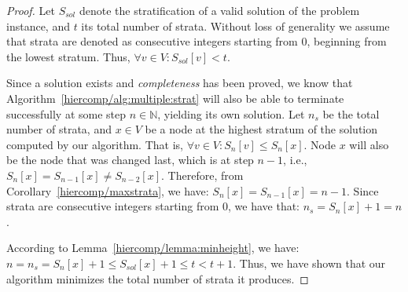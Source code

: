 \begin{proof}
  Let $S_{sol}$ denote the stratification of a valid solution of the
  problem instance, and $t$ its total number of strata. Without loss
  of generality we assume that strata are denoted as consecutive
  integers starting from $0$, beginning from the lowest stratum. Thus,
  $\forall v \in V : S_{sol}[v] < t$.

  Since a solution exists and \emph{completeness} has been proved, we
  know that Algorithm~\ref{hiercomp/alg:multiple:strat} will also be
  able to terminate successfully at some step $n \in \mathbb{N}$,
  yielding its own solution. Let $n_{s}$ be the total number of
  strata, and $x \in V$ be a node at the highest stratum of the
  solution computed by our algorithm. That is,
  $\forall v \in V : S_{n}[v] \leq S_{n}[x]$. Node $x$ will also be
  the node that was changed last, which is at step $n-1$, i.e.,
  $S_n[x] = S_{n-1}[x] \neq S_{n-2}[x]$. Therefore, from
  Corollary~\ref{hiercomp/maxstrata}, we have:
  $S_n[x] = S_{n-1}[x] = n - 1$. Since strata are consecutive integers
  starting from $0$, we have that: $n_{s} = S_n[x] + 1 = n$.

  According to Lemma~\ref{hiercomp/lemma:minheight}, we have:
  $n = n_{s} = S_n[x] + 1 \leq S_{sol}[x] + 1 \leq t < t + 1$. Thus,
  we have shown that our algorithm minimizes the total number of
  strata it produces.
\end{proof}
